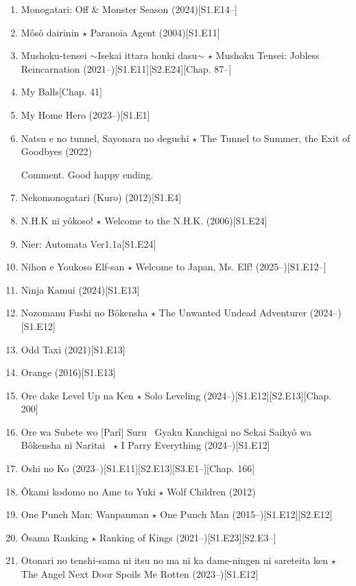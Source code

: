 \documentclass{article}
\begin{document}
\begin{enumerate}
    \item Monogatari: Off \& Monster Season (2024)\hfill[S1.E14--]
    \item {\sc Môsô dairinin $\star$ Paranoia Agent} (2004)\hfill[S1.E11]
    \item Mushoku-tensei $\sim$Isekai ittara honki dasu$\sim$ $\star$ Mushoku Tensei: Jobless Reincarnation (2021--)\hfill[S1.E11][S2.E24][Chap. 87--]
    \item My Balls\hfill[Chap. 41]
    \item My Home Hero (2023--)\hfill[S1.E1]
    \item {\sc Natsu e no tunnel, Sayonara no deguchi $\star$ The Tunnel to Summer, the Exit of Goodbyes} (2022)
    
    {\sf Comment.} Good happy ending.
    \item {\sc Nekomonogatari (Kuro)} (2012)[S1.E4]
    \item {\sc N.H.K ni yôkoso! $\star$ Welcome to the N.H.K.} (2006)\hfill[S1.E24]
    \item {\sc Nier: Automata Ver1.1a}\hfill[S1.E24]
    \item Nihon e Youkoso Elf-san $\star$ Welcome to Japan, Ms. Elf! (2025--)\hfill[S1.E12--]
    \item {\sc Ninja Kamui} (2024)\hfill[S1.E13]
    \item {\sc Nozomanu Fushi no Bôkensha $\star$ The Unwanted Undead Adventurer} (2024--)\hfill[S1.E12]
    \item {\sc Odd Taxi} (2021)\hfill[S1.E13]
    \item {\sc Orange} (2016)\hfill[S1.E13]
    \item {\sc Ore dake Level Up na Ken $\star$ Solo Leveling} (2024--)\hfill[S1.E12][S2.E13][Chap. 200]
    \item {\sc Ore wa Subete wo [Parî] Suru ~Gyaku Kanchigai no Sekai Saikyô wa Bôkensha ni Naritai~ $\star$ I Parry Everything} (2024--)\hfill[S1.E12]
    \item {\sc Oshi no Ko} (2023--)\hfill[S1.E11][S2.E13][S3.E1--][Chap. 166]
    \item {\sc \^Okami kodomo no Ame to Yuki $\star$ Wolf Children} (2012)
    \item One Punch Man: Wanpanman $\star$ One Punch Man (2015--)\hfill[S1.E12][S2.E12]
    \item \^Osama Ranking $\star$ Ranking of Kings (2021--)\hfill[S1.E23][S2.E3--]
    \item Otonari no tenshi-sama ni itsu no ma ni ka dame-ningen ni sareteita ken $\star$ The Angel Next Door Spoils Me Rotten (2023--)\hfill[S1.E12]

\end{enumerate}
\end{document}
